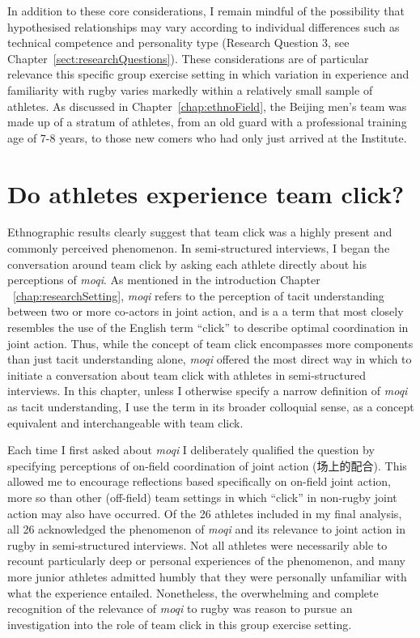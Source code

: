 \begin{CJK}{UTF8}{gbsn}
In addition to these core considerations, I remain mindful of the possibility that hypothesised relationships may vary according to individual differences such as technical competence and personality type (Research Question 3, see Chapter~\ref{sect:researchQuestions}).  These considerations are of particular relevance this specific group exercise setting in which variation in experience and familiarity with rugby varies markedly within a relatively small sample of athletes.  As discussed in Chapter~\ref{chap:ethnoField}, the Beijing men's team was made up of a stratum of athletes, from an old guard with a professional training age of 7-8 years, to those new comers who had only just arrived at the Institute.



  \section{Do athletes experience team click?\label{sect:teamClickExperience}}
Ethnographic results clearly suggest that team click was a highly present and commonly perceived phenomenon.   In semi-structured interviews, I began the conversation around team click by asking each athlete directly about his perceptions of \textit{moqi}.  As mentioned in the introduction Chapter ~\ref{chap:researchSetting}, \textit{moqi} refers to the perception of tacit understanding between two or more co-actors in joint action, and is a a term that most closely resembles the use of the English term ``click'' to describe optimal coordination in joint action.  Thus, while the concept of team click encompasses more components than just tacit understanding alone, \textit{moqi} offered the most direct way in which to initiate a conversation about team click with athletes in semi-structured interviews.  In this chapter, unless I otherwise specify a narrow definition of \textit{moqi} as tacit understanding, I use the term in its broader colloquial sense, as a concept equivalent and interchangeable with team click.

Each time I first asked about \textit{moqi} I deliberately qualified the question by specifying perceptions of on-field coordination of joint action (场上的配合).  This allowed me to encourage reflections based specifically on on-field joint action, more so than other (off-field) team settings in which ``click'' in non-rugby joint action may also have occurred.  Of the 26 athletes included in my final analysis, all 26 acknowledged the phenomenon of \textit{moqi} and its relevance to joint action in rugby in semi-structured interviews.  Not all athletes were necessarily able to recount particularly deep or personal experiences of the phenomenon, and many more junior athletes admitted humbly that they were personally unfamiliar with what the experience entailed.  Nonetheless, the overwhelming and complete recognition of the relevance of \textit{moqi} to rugby was reason to pursue an investigation into the role of team click in this group exercise setting.


\end{CJK}
